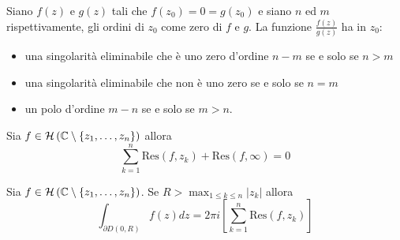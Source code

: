 \begin{thm}
Siano $f(z)$ e $g(z)$ tali che $f\left( z_{0}\right) =0=g\left( z_{0}\right)$ e siano $n$ ed $m$ rispettivamente, gli ordini di $z_{0}$ come zero di $f$ e $g$. La funzione $\frac{f(z)}{g(z)}$ ha in $z_{0}$:

\begin{itemize}
\item una singolarità eliminabile che è uno zero d'ordine $n-m$ se e solo se $n >m$
\item una singolarità eliminabile che non è uno zero se e solo se $n=m$
\item un polo d'ordine $m-n$ se e solo se $m >n$.
\end{itemize}
\end{thm}
\begin{thm}
Sia $f\in \mathcal{H} \left(\mathbb{C}  \setminus \left\{z_{1} ,\dotsc ,z_{n}\right\}\right)$ allora
\begin{equation*}
\sum\limits ^{n}_{k=1}\mathrm{Res}\left( f,z_{k}\right) +\mathrm{Res}\left( f,\infty \right) =0
\end{equation*}
\end{thm}
\begin{thm}
Sia $f\in \mathcal{H} \left(\mathbb{C}  \setminus \left\{z_{1} ,\dotsc ,z_{n}\right\}\right)$. Se $R >\max_{1\leqslant k\leqslant n}\left| z_{k}\right| $ allora
\begin{equation*}
\int\nolimits _{\partial D\left( 0,R\right)} f\left( z\right) dz=2\pi i\left[\sum\limits ^{n}_{k=1}\mathrm{Res}\left( f,z_{k}\right)\right]
\end{equation*}
\end{thm}
